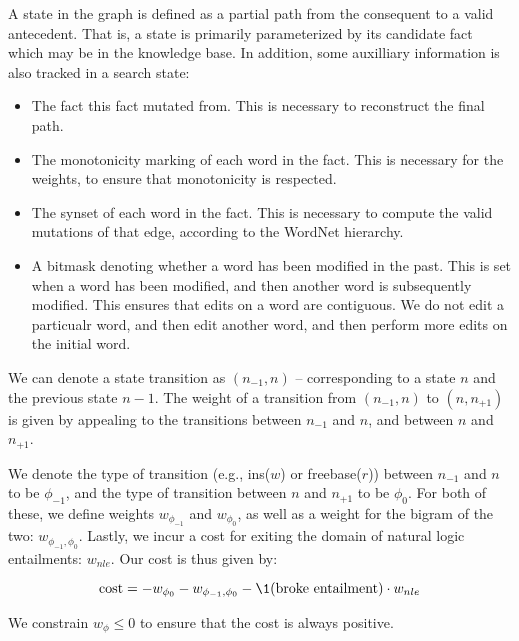 \documentclass[11pt,a4paper]{article}
\begin{document}
A state in the graph is defined as a partial path from the consequent to a
  valid antecedent.
That is, a state is primarily parameterized by its candidate fact which may be
  in the knowledge base.
In addition, some auxilliary information is also tracked in a search state:

\begin{itemize}
  \item The fact this fact mutated from.
        This is necessary to reconstruct the final path.
  \item The monotonicity marking of each word in the fact.
        This is necessary for the weights, to ensure that monotonicity is
          respected.
  \item The synset of each word in the fact.
        This is necessary to compute the valid mutations of that edge, according
          to the WordNet hierarchy.
  \item A bitmask denoting whether a word has been modified in the past.
        This is set when a word has been modified, and then another word is
          subsequently modified.
        This ensures that edits on a word are contiguous.
        We do not edit a particualr word, and then edit another word, and then
          perform more edits on the initial word.
\end{itemize}

We can denote a state transition as $(n_{-1}, n)$ -- 
  corresponding to a state $n$ and the previous state $n-1$.
The weight of a transition from $(n_{-1},n)$ to
  $(n,n_{+1})$ is given by appealing to the
  transitions between $n_{-1}$ and $n$, and between
  $n$ and $n_{+1}$.

We denote the type of transition 
  (e.g., ins($w$) or freebase($r$))
  between $n_{-1}$ and $n$ to be $\phi_{-1}$, and the
  type of transition between $n$ and $n_{+1}$ to
  be $\phi_0$.
For both of these, we define weights $w_{\phi_{-1}}$
  and $w_{\phi_0}$, as well as a weight for the
  bigram of the two: $w_{\phi_{-1}, \phi_0}$.
Lastly, we incur a cost for exiting the domain of natural
  logic entailments: $w_{nle}$.
Our cost is thus given by:

\begin{equation}
\textrm{cost} = - w_{\phi_{0}}
                - w_{\phi_{-1}, \phi_0}
                - \1(\textrm{broke entailment}) \cdot w_{nle}
\end{equation}

We constrain $w_{\phi} \leq 0$ to ensure that the
  cost is always positive. 
\end{document}
